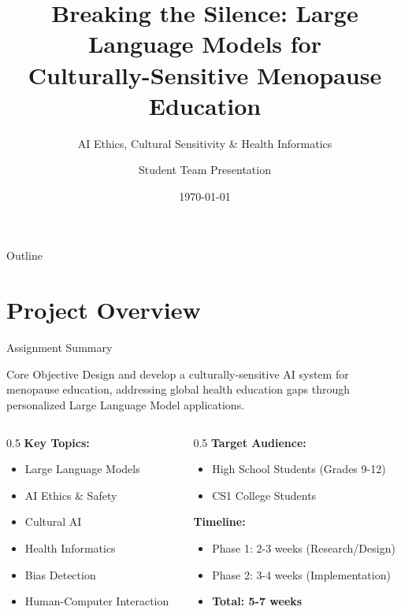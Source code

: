 \documentclass[aspectratio=169]{beamer}
\title[AI for Menopause Education]{Breaking the Silence: Large Language Models for\\Culturally-Sensitive Menopause Education}
\subtitle{AI Ethics, Cultural Sensitivity \& Health Informatics}
\author{Student Team Presentation}
\institute{Computer Science Department}
\date{\today}
\begin{document}
\begin{frame}
    \titlepage
\end{frame}

\begin{frame}{Outline}
    \tableofcontents
\end{frame}

\section{Project Overview}

\begin{frame}{Assignment Summary}
    \begin{block}{Core Objective}
        Design and develop a culturally-sensitive AI system for menopause education, addressing global health education gaps through personalized Large Language Model applications.
    \end{block}
    
    \begin{columns}[t]
        \begin{column}{0.5\textwidth}
            \textbf{Key Topics:}
            \begin{itemize}
                \item Large Language Models
                \item AI Ethics \& Safety
                \item Cultural AI
                \item Health Informatics
                \item Bias Detection
                \item Human-Computer Interaction
            \end{itemize}
        \end{column}
        \begin{column}{0.5\textwidth}
            \textbf{Target Audience:}
            \begin{itemize}
                \item High School Students (Grades 9-12)
                \item CS1 College Students
            \end{itemize}
            
            \textbf{Timeline:}
            \begin{itemize}
                \item Phase 1: 2-3 weeks (Research/Design)
                \item Phase 2: 3-4 weeks (Implementation)
                \item \textbf{Total: 5-7 weeks}
            \end{itemize}
        \end{column}
    \end{columns}
\end{frame}
\end{document}
